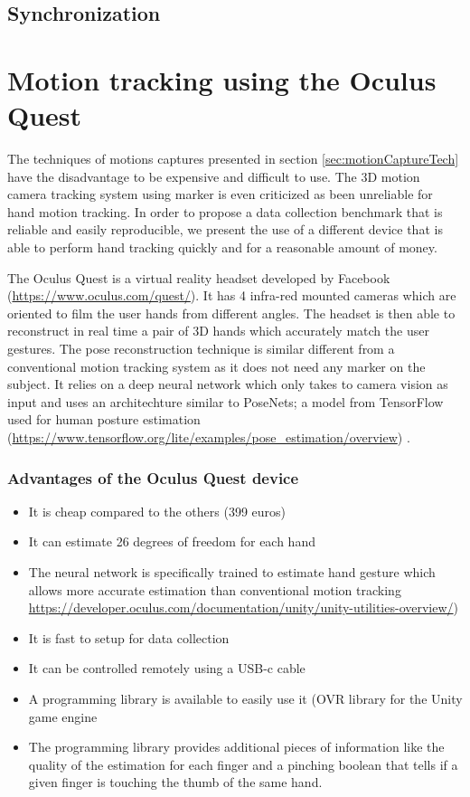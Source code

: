 \documentclass{article}
\begin{document}
\subsection{Synchronization}




\section{Motion tracking using the Oculus Quest}


The techniques of motions captures presented in section \ref{sec:motionCaptureTech} have the disadvantage to be expensive and difficult to use. The 3D motion camera tracking system using marker is even criticized as been unreliable for hand motion tracking. In order to propose a data collection benchmark that is reliable and easily reproducible, we present the use of a different device that is able to perform hand tracking quickly and for a reasonable amount of money.

The Oculus Quest is a virtual reality headset developed by Facebook (\url{https://www.oculus.com/quest/}). It has 4 infra-red mounted cameras which are oriented to film the user hands from different angles. The headset is then able to reconstruct in real time a pair of 3D hands which accurately match the user gestures. The pose reconstruction technique is similar different from a conventional motion tracking system as it does not need any marker on the subject. It relies on a deep neural network which only takes to camera vision as input and uses an architechture similar to PoseNets; a model from TensorFlow used for human posture estimation (\url{https://www.tensorflow.org/lite/examples/pose_estimation/overview}) \cite{ref:oculus1, ref:oculus2}.

\subsubsection{Advantages of the Oculus Quest device}
\begin{itemize}
    \item It is cheap compared to the others (399 euros)
    \item It can estimate 26 degrees of freedom for each hand \cite{ref:oculus2}
    \item The neural network is specifically trained to estimate hand gesture which allows more accurate estimation than conventional motion tracking
     \url{https://developer.oculus.com/documentation/unity/unity-utilities-overview/})
    \item It is fast to setup for data collection
    \item It can be controlled remotely using a USB-c cable
    \item A programming library is available to easily use it (OVR library for the Unity game engine
    \item The programming library provides additional pieces of information like the quality of the estimation for each finger and a pinching boolean that tells if a given finger is touching the thumb of the same hand.
\end{itemize}
\end{document}
